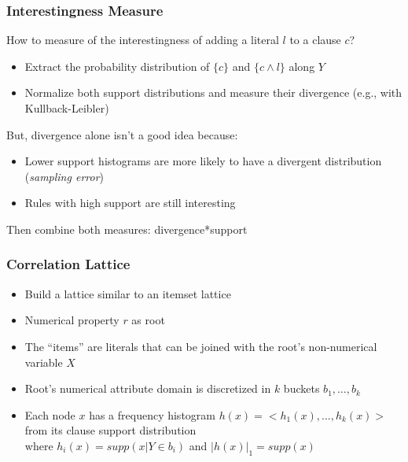 \documentclass{beamer}
\begin{document}
\begin{frame}
\frametitle{Interestingness Measure}
  How to measure of the interestingness of adding a literal $l$ to a clause $c$?
  \begin{itemize}
   \item Extract the probability distribution of $\{c\}$ and $\{c \wedge l\}$ along $Y$
   \item Normalize both support distributions and measure their divergence (e.g., with Kullback-Leibler)
  \end{itemize}
  But, divergence alone isn't a good idea because:
  \begin{itemize}
   \item Lower support histograms are more likely to have a divergent distribution (\emph{sampling error})
   \item Rules with high support are still interesting
  \end{itemize}
  Then combine both measures: divergence*support
\end{frame}
\begin{frame}
\frametitle{Correlation Lattice}
  \begin{itemize}
   \item Build a lattice similar to an itemset lattice 
   \item Numerical property $r$ as root 
   \item The ``items'' are literals that can be joined with the root's non-numerical variable $X$
   \item Root's numerical attribute domain is discretized in $k$ buckets $b_1,\dots,b_k$
   \item Each node $x$ has a frequency histogram $h(x)=<h_1(x),\ldots,h_k(x)>$ from its clause support distribution \\
      \quad where $h_i(x)=supp(x|Y \in b_i)$ \quad and \quad $|h(x)|_1=supp(x)$
  \end{itemize}
\end{frame}
\end{document}
